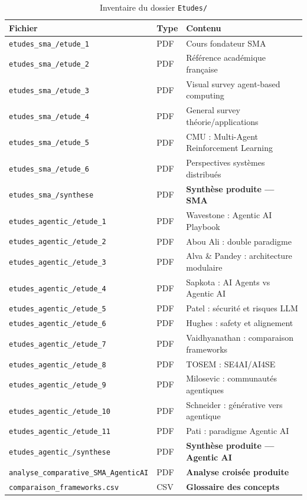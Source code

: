 \documentclass[12pt,a4paper]{report}
\begin{document}
\begin{table}[H]
\centering
\caption{Inventaire du dossier \texttt{Etudes/}}
\label{tab:etudes}
\begin{tabularx}{\textwidth}{L{5cm}C{1.5cm}L{6.5cm}}
\toprule
\textbf{Fichier} & \textbf{Type} & \textbf{Contenu} \\
\midrule
\texttt{etudes\_sma\_/etude\_1} & PDF & Cours fondateur SMA \\
\texttt{etudes\_sma\_/etude\_2} & PDF & Référence académique française \\
\texttt{etudes\_sma\_/etude\_3} & PDF & Visual survey agent-based computing \\
\texttt{etudes\_sma\_/etude\_4} & PDF & General survey théorie/applications \\
\texttt{etudes\_sma\_/etude\_5} & PDF & CMU : Multi-Agent Reinforcement Learning \\
\texttt{etudes\_sma\_/etude\_6} & PDF & Perspectives systèmes distribués \\
\texttt{etudes\_sma\_/synthese} & PDF & \textbf{Synthèse produite — SMA} \\
\addlinespace
\texttt{etudes\_agentic\_/etude\_1} & PDF & Wavestone : Agentic AI Playbook \\
\texttt{etudes\_agentic\_/etude\_2} & PDF & Abou Ali : double paradigme \\
\texttt{etudes\_agentic\_/etude\_3} & PDF & Alva \& Pandey : architecture modulaire \\
\texttt{etudes\_agentic\_/etude\_4} & PDF & Sapkota : AI Agents vs Agentic AI \\
\texttt{etudes\_agentic\_/etude\_5} & PDF & Patel : sécurité et risques LLM \\
\texttt{etudes\_agentic\_/etude\_6} & PDF & Hughes : safety et alignement \\
\texttt{etudes\_agentic\_/etude\_7} & PDF & Vaidhyanathan : comparaison frameworks \\
\texttt{etudes\_agentic\_/etude\_8} & PDF & TOSEM : SE4AI/AI4SE \\
\texttt{etudes\_agentic\_/etude\_9} & PDF & Milosevic : communautés agentiques \\
\texttt{etudes\_agentic\_/etude\_10} & PDF & Schneider : générative vers agentique \\
\texttt{etudes\_agentic\_/etude\_11} & PDF & Pati : paradigme Agentic AI \\
\texttt{etudes\_agentic\_/synthese} & PDF & \textbf{Synthèse produite --- Agentic AI} \\
\addlinespace
\texttt{analyse\_comparative\_SMA\_AgenticAI} & PDF & \textbf{Analyse croisée produite} \\
\texttt{comparaison\_frameworks.csv} & CSV & \textbf{Glossaire des concepts} \\
\bottomrule
\end{tabularx}
\end{table}
\end{document}
